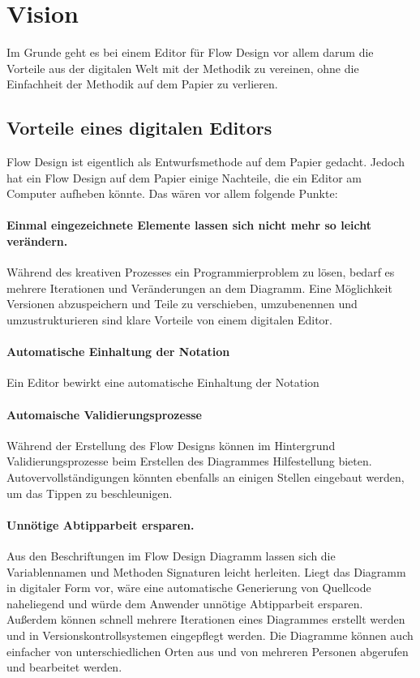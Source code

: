 
\chapter{Vision}

Im Grunde geht es bei einem Editor für Flow Design vor allem darum die Vorteile aus der digitalen Welt mit
der Methodik zu vereinen, ohne die Einfachheit der Methodik auf dem Papier zu
      verlieren.

\section{Vorteile eines digitalen Editors}

Flow Design ist eigentlich als Entwurfsmethode auf dem Papier gedacht.
Jedoch hat ein Flow Design auf dem Papier einige Nachteile, die ein Editor am
Computer aufheben könnte. Das wären vor allem folgende Punkte:
\subsubsection{Einmal eingezeichnete Elemente lassen sich nicht mehr so leicht verändern.}

Während des kreativen Prozesses ein Programmierproblem zu lösen, bedarf es
mehrere Iterationen und Veränderungen an dem Diagramm. Eine Möglichkeit Versionen
abzuspeichern und Teile zu verschieben, umzubenennen und umzustrukturieren sind
klare Vorteile von einem digitalen Editor.
\subsubsection{Automatische Einhaltung der Notation}

Ein Editor bewirkt eine automatische Einhaltung der Notation
\subsubsection{Automaische Validierungsprozesse}

Während der Erstellung des Flow Designs können im Hintergrund
Validierungsprozesse beim Erstellen des Diagrammes Hilfestellung bieten.
Autovervollständigungen könnten ebenfalls an einigen Stellen eingebaut werden,
um das Tippen zu beschleunigen.
\subsubsection{Unnötige Abtipparbeit ersparen.}

Aus den Beschriftungen im Flow Design Diagramm lassen sich die Variablennamen und
Methoden Signaturen leicht herleiten. Liegt das Diagramm in digitaler Form vor,
wäre eine automatische Generierung von Quellcode naheliegend und
würde dem Anwender unnötige Abtipparbeit ersparen. Außerdem können schnell
mehrere Iterationen eines Diagrammes erstellt werden und in
Versionskontrollsystemen eingepflegt werden.
Die Diagramme können auch einfacher von unterschiedlichen Orten aus und von mehreren
Personen abgerufen und bearbeitet werden.

